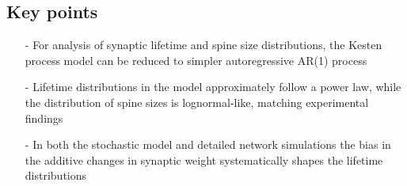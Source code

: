 \documentclass[a0,landscape]{a0poster}
\begin{document}
\begin{multicols}{3} %
  
  
  
  
                          

\vspace{1.5cm}

\begin{minipage}{\columnwidth}

  \section{Key points}

\begin{itemize}
\item[-] For analysis of synaptic lifetime and spine size distributions, the Kesten process model can be reduced to simpler autoregressive AR(1) process
\item[-] Lifetime distributions in the model approximately follow a power law, while the distribution of spine sizes is lognormal-like, matching experimental findings
\item[-] In both the stochastic model and detailed network simulations the bias in the additive changes in synaptic weight systematically shapes the lifetime distributions
\end{itemize}

  \printbibliography  
\end{minipage}
\end{multicols}



\end{document}
